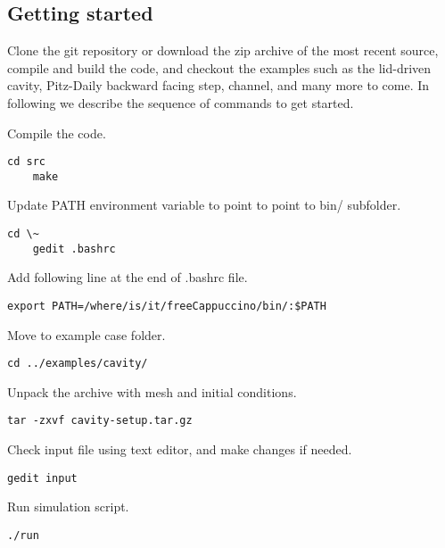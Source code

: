\documentclass[11pt,a4paper]{report}
\begin{document}
\subsection{Getting started}

Clone the git repository or download the zip archive of the most recent source, compile and build the code, and checkout the examples such as the lid-driven cavity, Pitz-Daily backward facing step, channel, and many more to come. In following we describe the sequence of commands to get started.

Compile the code.

\begin{lstlisting}[style=BashInputStyle]
    cd src
    make
\end{lstlisting}

Update PATH environment variable to point to point to bin/ subfolder.

\begin{lstlisting}[style=BashInputStyle]
    cd \~
    gedit .bashrc
\end{lstlisting}

Add following line at the end of .bashrc file.

\begin{lstlisting}[style=BashInputStyle]
    export PATH=/where/is/it/freeCappuccino/bin/:$PATH
\end{lstlisting}

Move to example case folder.

\begin{lstlisting}[style=BashInputStyle]
    cd ../examples/cavity/
\end{lstlisting}

Unpack the archive with mesh and initial conditions.

\begin{lstlisting}[style=BashInputStyle]
    tar -zxvf cavity-setup.tar.gz
\end{lstlisting}

Check input file using text editor, and make changes if needed.

\begin{lstlisting}[style=BashInputStyle]
    gedit input
\end{lstlisting}

Run simulation script.

\begin{lstlisting}[style=BashInputStyle]
    ./run
\end{lstlisting}
\end{document}
